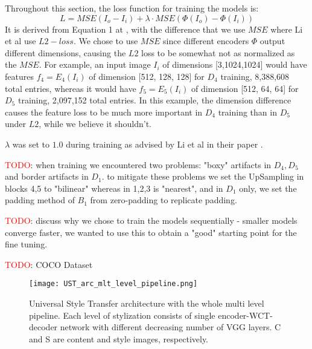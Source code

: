 Throughout this section, the loss function for training the models is:
\begin{equation}
L = MSE(I_o-I_i) + \lambda \cdot MSE(\Phi(I_o)-\Phi(I_i))
\end{equation}
It is derived from Equation 1 at \cite{bib11}, with the difference that we use $MSE$ where Li et al use $L2 -loss$. We chose to use $MSE$ since different encoders $\Phi$ output different dimensions, causing the $L2$ loss to be  somewhat not as normalized as the $MSE$. For example, an input image $I_i$ of dimensions [3,1024,1024] would have features $f_4=E_4(I_i)$ of dimension [512, 128, 128] for $D_4$ training, 8,388,608 total entries, whereas it would have $f_5=E_5(I_i)$ of dimension [512, 64, 64] for $D_5$ training, 2,097,152 total entries. In this example, the dimension difference causes the feature loss to be much more important in $D_4$ training than in $D_5$ under $L2$, while we believe it shouldn't.

$\lambda$ was set to $1.0$ during training as advised by Li et al in their paper \cite{bib11}.

\textcolor{red}{TODO}: when training we encountered two problems: "boxy" artifacts in $D_4, D_5$ and border artifacts in $D_1$. to mitigate these problems we set the UpSampling in blocks 4,5 to "bilinear" whereas in 1,2,3 is "nearest", and in $D_1$ only, we set the padding method of $B_1$ from zero-padding to replicate padding.

\textcolor{red}{TODO}: discuss why we chose to train the models sequentially - smaller models converge faster, we wanted to use this to obtain a "good" starting point for the fine tuning.

\textcolor{red}{TODO}: COCO Dataset

\begin{figure}[h!]
	\centering
		\texttt{[image: UST\_arc\_mlt\_level\_pipeline.png]}
	\caption{Universal Style Transfer architecture with the whole multi level pipeline. Each level of stylization consists of single encoder-WCT-decoder network with different decreasing number of VGG layers. C and S are content and style images, respectively.
	}
	\label{fig:full-pipeline}
\end{figure}